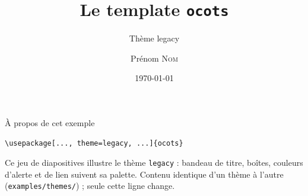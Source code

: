 \documentclass[9pt,t]{beamer}
\title{Le template \texttt{ocots}}
\subtitle{Th\`eme legacy}
\author{Prénom \textsc{Nom}}
\date{\today}
\begin{document}
\slidetitlepage%

\begin{frame}[fragile]{\`A propos de cet exemple}
\begin{lstlisting}
\usepackage[..., theme=legacy, ...]{ocots}
\end{lstlisting}
Ce jeu de diapositives illustre le th\`eme \texttt{legacy} : bandeau de
titre, bo\^ites, couleurs d'alerte et de lien suivent sa palette. Contenu
identique d'un th\`eme \`a l'autre (\texttt{examples/themes/}) ; seule
cette ligne change.
\end{frame}


\end{document}

